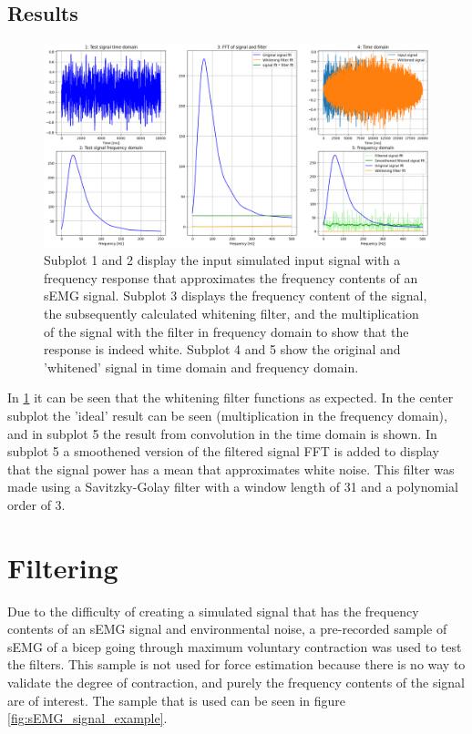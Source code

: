 \subsection{Results}
\begin{figure}[h!t]
	\begin{center}
		\includegraphics[width=1.0\columnwidth]{images/prewhitening_simulation.png}
	\end{center}
	\caption{Subplot 1 and 2 display the input simulated input signal with a frequency response that approximates the frequency contents of an sEMG signal. Subplot 3 displays the frequency content of the signal, the subsequently calculated whitening filter, and the multiplication of the signal with the filter in frequency domain to show that the response is indeed white. Subplot 4 and 5 show the original and 'whitened' signal in time domain and frequency domain.}
	\label{fig:whitening_simulation}
\end{figure}

In \ref{fig:whitening_simulation} it can be seen that the whitening filter functions as expected. In the center subplot the 'ideal' result can be seen (multiplication in the frequency domain), and in subplot 5 the result from convolution in the time domain is shown. In subplot 5 a smoothened version of the filtered signal FFT is added to display that the signal power has a mean that approximates white noise. This filter was made using a Savitzky-Golay filter with a window length of 31 and a polynomial order of 3.

\section{Filtering}
Due to the difficulty of creating a simulated signal that has the frequency contents of an sEMG signal and environmental noise, a pre-recorded sample of sEMG of a bicep going through maximum voluntary contraction was used to test the filters. This sample is not used for force estimation because there is no way to validate the degree of contraction, and purely the frequency contents of the signal are of interest. The sample that is used can be seen in figure \ref{fig:sEMG_signal_example}. 

